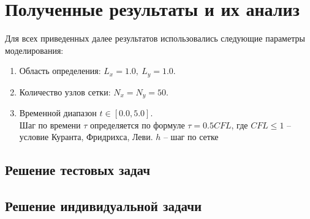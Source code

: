 \documentclass[a4paper,12pt]{article}
\begin{document}
\newpage
\section{Полученные результаты и их анализ}
\label{sec:normal}
Для всех приведенных далее результатов использовались следующие параметры моделирования:
 \begin{enumerate}
	\item Область определения: $L_x = 1.0, \ L_y = 1.0.$
	\item Количество узлов сетки: $N_x = N_y = 50.$
	\item Временной диапазон $t \in [0.0, 5.0]$.\\ Шаг по времени $\tau$ определяется по формуле $\tau = 0.5 CFL$, где $CFL \leq 1$ -- условие Куранта, Фридрихса, Леви. $h$ -- шаг по сетке
\end{enumerate}
\subsection{Решение тестовых задач}

\subsection{Решение индивидуальной задачи}
\end{document}
